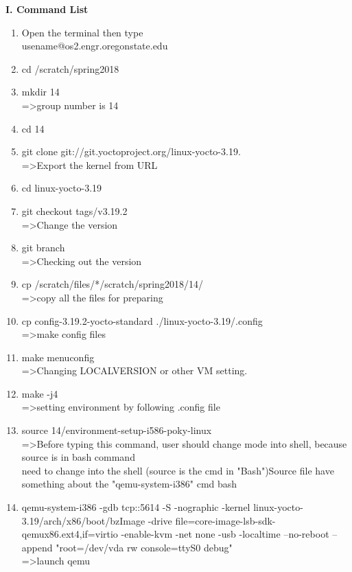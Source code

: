 \documentclass[english,10pt,letterpaper,onecolumn]{IEEEtran}
\begin{document}
 
\begin{center}
{\bf I. Command List}
\begin{enumerate}
  	\item Open the terminal then type \\
  	usename@os2.engr.oregonstate.edu
  	\item cd /scratch/spring2018
  	\item mkdir 14 \\
  	=\textgreater group number is 14
  	\item cd 14
  	\item git clone git://git.yoctoproject.org/linux-yocto-3.19.\\
  	=\textgreater Export the kernel from URL
  	\item cd linux-yocto-3.19
  	\item git checkout tags/v3.19.2\\
  =\textgreater Change the version
  \item git branch  \\
  =\textgreater Checking out the version
  \item cp /scratch/files/*/scratch/spring2018/14/ \\
  =\textgreater copy all the files for preparing
  \item cp config-3.19.2-yocto-standard ./linux-yocto-3.19/.config\\
  =\textgreater make config files
  \item make menuconfig\\
   =\textgreater Changing LOCALVERSION or other VM setting.
  \item make -j4\\ 
   =\textgreater setting environment by following .config file
  \item source 14/environment-setup-i586-poky-linux\\
  =\textgreater Before typing this command, user should change mode into shell, because source is in bash command\\need to change into the shell (source is the cmd in "Bash")Source file have something about the "qemu-system-i386" cmd bash
  \item qemu-system-i386 -gdb tcp::5614 -S -nographic -kernel linux-yocto-3.19/arch/x86/boot/bzImage  -drive file=core-image-lsb-sdk-qemux86.ext4,if=virtio -enable-kvm -net none -usb -localtime --no-reboot --append "root=/dev/vda rw console=ttyS0 debug"\\
  =\textgreater launch qemu\\

\end{enumerate}
\end{center}
\end{document}

